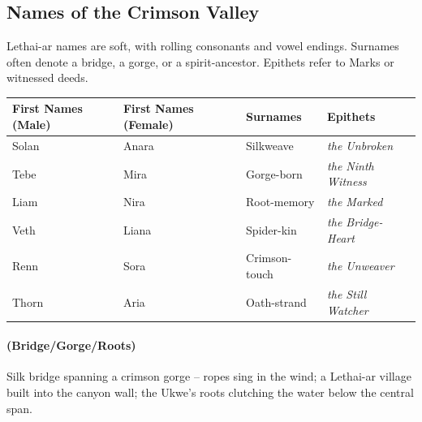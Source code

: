 \subsection*{Names of the Crimson Valley}
\label{sec:lethaiar-names}

Lethai-ar names are soft, with rolling consonants and vowel endings. Surnames often denote a bridge, a gorge, or a spirit-ancestor. Epithets refer to Marks or witnessed deeds.

\begin{tabular}{|p{}|p{}|p{}|p{}|}
\hline
\textbf{First Names (Male)} & \textbf{First Names (Female)} & \textbf{Surnames} & \textbf{Epithets} \\
\hline
Solan & Anara & Silkweave & \textit{the Unbroken} \\
\hline
Tebe & Mira & Gorge-born & \textit{the Ninth Witness} \\
\hline
Liam & Nira & Root-memory & \textit{the Marked} \\
\hline
Veth & Liana & Spider-kin & \textit{the Bridge-Heart} \\
\hline
Renn & Sora & Crimson-touch & \textit{the Unweaver} \\
\hline
Thorn & Aria & Oath-strand & \textit{the Still Watcher} \\
\hline
\end{tabular}

\paragraph*{(Bridge/Gorge/Roots)} Silk bridge spanning a crimson gorge -- ropes sing in the wind; a Lethai-ar village built into the canyon wall; the Ukwe's roots clutching the water below the central span.

